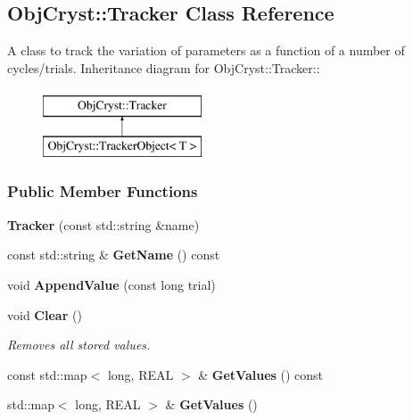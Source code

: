 \subsection{ObjCryst::Tracker Class Reference}
\label{a00106}


A class to track the variation of parameters as a function of a number of cycles/trials.  
Inheritance diagram for ObjCryst::Tracker::\begin{figure}[H]
\begin{center}
\leavevmode
\includegraphics[height=2cm]{a00106}
\end{center}
\end{figure}
\subsubsection*{Public Member Functions}
\begin{DoxyCompactItemize}
\item 
{\bfseries Tracker} (const std::string \&name)\label{a00106_a57d89249ba910902e6ef6a33dcd3ee8c}

\item 
const std::string \& {\bfseries GetName} () const \label{a00106_ad93197775f7d0a3b52eb199a9ed1c958}

\item 
void {\bfseries AppendValue} (const long trial)\label{a00106_ae50d08700a131d280f8a19a58274bfe7}

\item 
void {\bf Clear} ()\label{a00106_abdac1cff42cfd8d66e10977a5a9066b3}

\begin{DoxyCompactList}\small\item\em Removes all stored values. \item\end{DoxyCompactList}\item 
const std::map$<$ long, REAL $>$ \& {\bfseries GetValues} () const \label{a00106_a882fe8d7c193662613d4a9ab262a2417}

\item 
std::map$<$ long, REAL $>$ \& {\bfseries GetValues} ()\label{a00106_a4f889b0d29a403c597040c5b88f4ffa8}

\end{DoxyCompactItemize}
